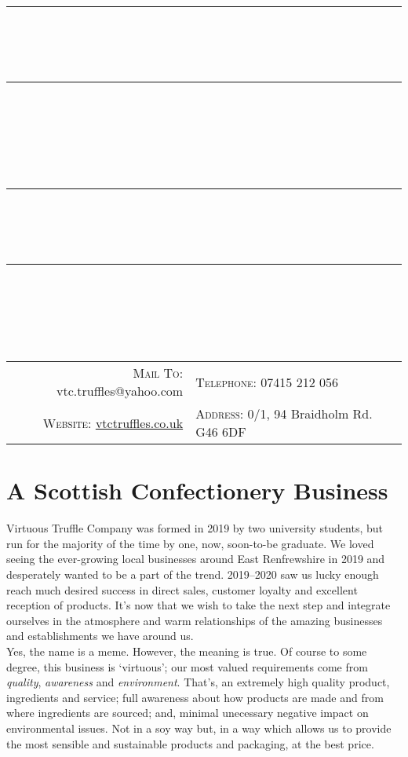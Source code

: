 \documentclass[11pt, english]{article}
\newcommand{\HRule}[1]{\rule{\linewidth}{#1}}
\begin{document}

	\title{
		\HRule{0.5pt}\\ [-0.7cm]
		\HRule{0.5pt}\\ [-0.125cm]
		\Huge{}\\
		\Large{}
		\HRule{0.5pt}\\ [-0.7cm]
		\HRule{0.5pt}\\ [-1.5cm]
		}
        \author{\textit{}}
        \date{}
        \maketitle

\begin{center}
	\scriptsize
\begin{tabular}{r|l}
	\textsc{Mail To:} vtc.truffles@yahoo.com & \textsc{Telephone:} 07415 212 056\\
	\textsc{Website:} \href{http://vtctruffles.co.uk}{vtctruffles.co.uk} & \textsc{Address:} 0/1, 94 Braidholm Rd. G46 6DF\\
\end{tabular}
\end{center}

\section{A Scottish Confectionery Business}

\footnotesize Virtuous Truffle Company was formed in 2019 by two university students, but run for the majority of the time by one, now, soon-to-be graduate. We loved seeing the ever-growing local businesses around East Renfrewshire in 2019 and desperately wanted to be a part of the trend. 2019--2020 saw us lucky enough reach much desired success in direct sales, customer loyalty and excellent reception of products. It's now that we wish to take the next step and integrate ourselves in the atmosphere and warm relationships of the amazing businesses and establishments we have around us.\\

Yes, the name is a meme. However, the meaning is true. Of course to some degree, this business is `virtuous'; our most valued requirements come from \textit{quality}, \textit{awareness} and \textit{environment}. That's, an extremely high quality product, ingredients and service; full awareness about how products are made and from where ingredients are sourced; and, minimal unecessary negative impact on environmental issues. Not in a soy way but, in a way which allows us to provide the most sensible and sustainable products and packaging, at the best price.
\end{document}
